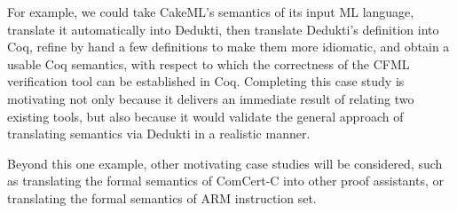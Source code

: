 \begin{workpackage}[id=libraries,wphases=0-48,type=RTD,
  short=Libraries,%
  title=Libraries,
  lead=Inr,
  InrRM=10]
For example, we could take CakeML's semantics of its input ML language,
translate it automatically into Dedukti, then translate Dedukti's
definition into Coq, refine by hand a few definitions to make them more
idiomatic, and obtain a usable Coq semantics, with respect to which
the correctness of the CFML verification tool can be established in Coq.
Completing this case study is motivating not only because it delivers
an immediate result of relating two existing tools, but also because it
would validate the general approach of translating semantics via Dedukti
in a realistic manner.

Beyond this one example, other motivating case studies will be considered,
such as translating the formal semantics of ComCert-C into other proof
assistants, or translating the formal semantics of ARM instruction set.


\begin{tasklist}
\begin{task}[id=mathcomp,title=MathComp]
\end{task}

\begin{task}[id=milc,title=Revised Coq Analysis Library]
\end{task}


\begin{task}[id=afp,title=The Isabelle Archive of Formal Proofs]
\end{task}

\begin{task}[id=isaAnalysisProb,title=The Isabelle Analysis \& Probability library]
\end{task}

\begin{task}[id=geocoq,title=The GeoCoq library]
\end{task}

\begin{task}[id=flyspeck,title=The Flyspeck library]
\end{task}

\begin{task}[id=cakeml,title=The CakeML programming language library]
\end{task}


\end{tasklist}
\end{workpackage}
